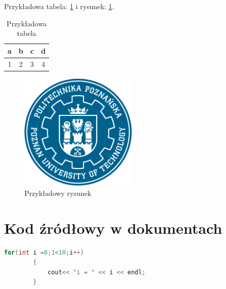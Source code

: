 \documentclass[10pt,a4paper]{article}
\begin{document}
	Przykładowa tabela: \ref{tab} i rysunek: \ref{rys}.
	
	\begin{table}[h!]
		\centering
		\caption{Przykładowa tabela}
		\label{tab}
		\begin{tabular}{c|c|c|c}
			a & b & c & d \\ \hline
			1 & 2 & 3 & 4
		\end{tabular}
	\end{table}

	\begin{figure}[h!]
		\centering
		\includegraphics[width=0.5\textwidth]{Rys/pp-putlogopelne.png}
		\caption{Przykładowy rysunek}
		\label{rys}
	\end{figure}

\section{Kod źródłowy w dokumentach}

	\begin{lstlisting}[language=C++]
		for(int i =0;1<10;i++)
		{ 
			cout<< "i = " << i << endl;
		}
	\end{lstlisting}
	
	
\end{document}
